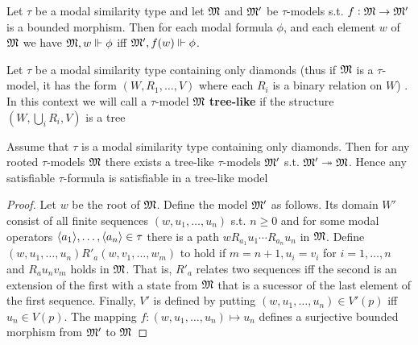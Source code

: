 \documentclass[11pt]{article}
\begin{document}
\begin{proposition}[]
Let \(\tau\) be a modal similarity type and let \(\mathfrak{M}\) and \(\mathfrak{M}'\) be
\(\tau\)-models s.t. \(f:\mathfrak{M}\to\mathfrak{M}'\) is a bounded morphism. Then for each
modal formula \(\phi\), and each element \(w\) of \(\mathfrak{M}\) we have
\(\mathfrak{M},w\Vdash\phi\) iff \(\mathfrak{M}',f(w)\Vdash\phi\).
\end{proposition}


Let \(\tau\) be a modal similarity type containing only diamonds (thus if \(\mathfrak{M}\)
is a \(\tau\)-model, it has the form \((W,R_1,\dots,V)\) where each \(R_i\)
is a binary relation on \(W\)) . In this context we will call a
\(\tau\)-model \(\mathfrak{M}\) \textbf{tree-like} if the structure \((W,\bigcup_i R_i,V)\) is
a tree

\begin{proposition}[]
\label{prop2.15}
Assume that \(\tau\) is a modal similarity type containing only diamonds. Then for
any rooted \(\tau\)-models \(\mathfrak{M}\) there exists a tree-like \(\tau\)-models
\(\mathfrak{M}'\) s.t. \(\mathfrak{M}'\twoheadrightarrow\mathfrak{M}\). Hence any satisfiable
\(\tau\)-formula is satisfiable in a tree-like model
\end{proposition}

\begin{proof}
Let \(w\) be the root of \(\mathfrak{M}\). Define the model \(\mathfrak{M}'\) as follows. Its
domain \(W'\) consist of all finite sequences \((w,u_1,\dots,u_n)\) s.t.
\(n\ge0\) and for some modal operators \(\langle a_1\rangle,\dots,\langle
    a_n\rangle\in\tau\) there is a path \(wR_{a_1}u_1\cdots R_{a_n}u_n\) in \(\mathfrak{M}\).
Define \((w,u_1,\dots,u_n)R'_a(w,v_1,\dots,w_m)\) to hold if
\(m=n+1,u_i=v_i\) for \(i=1,\dots,n\) and \(R_au_nv_m\) holds in \(\mathfrak{M}\).
That is, \(R'_a\) relates two sequences iff the second is an extension of
the first with a state from \(\mathfrak{M}\) that is a sucessor of the last element
of the first sequence. Finally, \(V'\) is defined by putting
\((w,u_1,\dots,u_n)\in V'(p)\) iff \(u_n\in V(p)\). The mapping
\(f:(w,u_1,\dots,u_n)\mapsto u_n\) defines a surjective bounded morphism
from \(\mathfrak{M}'\) to \(\mathfrak{M}\)
\end{proof}
\end{document}
